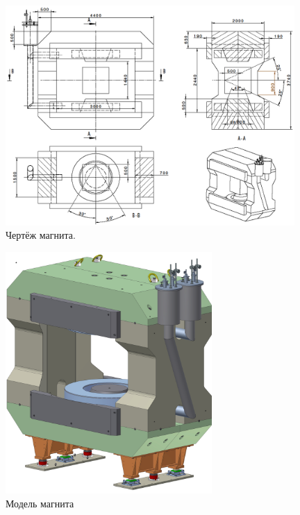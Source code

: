 \begin{figure}[H]
\includegraphics[width=0.98\textwidth]{pictures/Magnet_drawing.png}
\caption{Чертёж магнита.} %
\label{fig:MagnetDrawing}
\end{figure}

\begin{figure}[H]
\includegraphics[width=0.7\textwidth]{pictures/CBM_magnet_model.png}
\caption{Модель магнита}
\label{fig:MagnetModel}
\end{figure}


